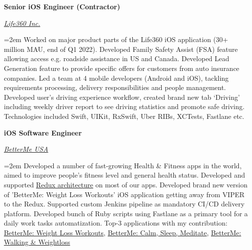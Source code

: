 \documentclass[12pt]{article}
\newcommand{\experience}[4]{
    \noindent \textbf{#1}
    \hfill \text{#2} \par
    \noindent \textit{#3} \par
    \noindent\hangindent=2em\hangafter=0 \small #4 
    \normalsize \par
}
\begin{document}
\experience
{Senior iOS Engineer (Contractor)}
{2020/01--2022/04}
{\href{https://www.life360.com}{Life360 Inc.}}
{
Worked on major product parts of the Life360 iOS application 
(30+ million MAU, end of Q1 2022). Developed Family Safety Assist (FSA) feature allowing access 
e.g. roadside assistance in US and Canada. Developed Lead Generation feature to provide specific offers 
for customers from auto insurance companies. Led a team at 4 mobile developers (Android and iOS), 
tackling requirements processing, delivery responsibilities and people management. Developed user's 
driving experience workflow, created brand new tab ‘Driving’ including weekly driver report 
to see driving statistics and promote safe driving.\newline
Technologies included Swift, UIKit, RxSwift, Uber RIBs, XCTests, Fastlane etc.
}

\experience
{iOS Software Engineer}
{Nov 2018 -- Dec 2019}
{\href{https://betterme.world/about}{BetterMe USA}}
{
Developed a number of fast-growing Health \& Fitness apps in the world, 
aimed to improve people’s fitness level and general health status. Developed and supported 
\href{https://www.raywenderlich.com/books/advanced-ios-app-architecture/v3.0/chapters/6-architecture-redux}{Redux architecture} 
on most of our apps. Developed brand new version of 'BetterMe: Weight Loss Workouts' iOS application 
getting away from VIPER to the Redux. Supported custom Jenkins pipeline as mandatory CI/CD delivery platform. 
Developed bunch of Ruby scripts using Fastlane as a primary tool for a daily work tasks automatization.
\newline Top-3 applications with my contribution: 
\href{https://apps.apple.com/us/app/betterme-weight-loss-workouts/id1264546236}{BetterMe: Weight Loss Workouts}, 
\href{https://apps.apple.com/us/app/betterme-calm-sleep-meditate/id1363010081}{BetterMe: Calm, Sleep, Meditate}, 
\href{https://apps.apple.com/us/app/betterme-walking-weightloss/id1434400695}{BetterMe: Walking \& Weightloss}
}
\end{document}
